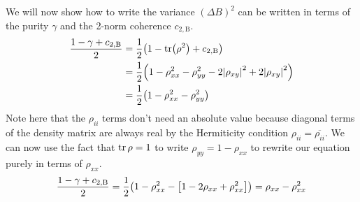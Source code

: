 \documentclass[11pt]{article}
\newcommand{\twonormE}[1][\rho]{c_{2,\mathrm{B}}}
\begin{document}
We will now show how to write the variance $(\Delta B)^2$ can be written in terms of the purity $\gamma$ and the 2-norm coherence $\twonormE$.
\begin{align*}
	\frac{1 - \gamma + \twonormE}{2} & = \frac{1}{2}\qty(1 - \tr(\rho^2) + \twonormE)                                             \\
	                                 & = \frac{1}{2}\qty(1 - \rho_{xx}^2 - \rho_{yy}^2 - 2\abs{\rho_{xy}}^2 + 2\abs{\rho_{xy}}^2) \\
	                                 & = \frac{1}{2}\qty(1 - \rho_{xx}^2 - \rho_{yy}^2)
\end{align*}
Note here that the $\rho_{ii}$ terms don't need an absolute value because diagonal terms of the density matrix are always real by the Hermiticity condition $\rho_{ii} = \overline{\rho_{ii}}$.
We can now use the fact that $\tr\rho = 1$ to write $\rho_{yy} = 1 - \rho_{xx}$ to rewrite our equation purely in terms of $\rho_{xx}$.
\begin{equation*}
	\frac{1 - \gamma + \twonormE}{2} =\frac{1}{2}\qty(1 - \rho_{xx}^2 - \qty[1 - 2\rho_{xx} + \rho_{xx}^2]) = \rho_{xx} - \rho_{xx}^2
\end{equation*}



\clearpage


\end{document}
